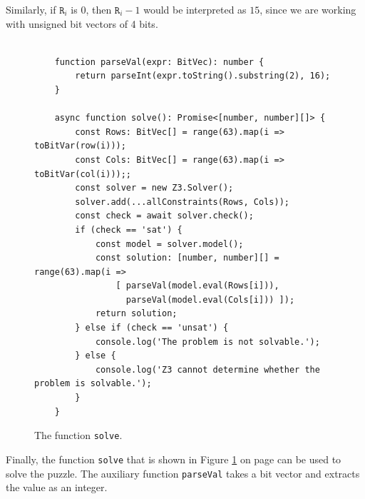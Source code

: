 \begin{enumerate}
      Similarly, if $\mathtt{R}_i$ is $0$, then $\mathtt{R}_i - 1$ would be interpreted as $15$,
      since we are working with unsigned bit vectors of 4 bits.
\end{enumerate}

\begin{figure}[!ht]
\centering
\begin{verbatim}

    function parseVal(expr: BitVec): number {
        return parseInt(expr.toString().substring(2), 16);
    }
    
    async function solve(): Promise<[number, number][]> {
        const Rows: BitVec[] = range(63).map(i => toBitVar(row(i)));
        const Cols: BitVec[] = range(63).map(i => toBitVar(col(i)));;
        const solver = new Z3.Solver();
        solver.add(...allConstraints(Rows, Cols));
        const check = await solver.check();      
        if (check == 'sat') {
            const model = solver.model();
            const solution: [number, number][] = range(63).map(i => 
                [ parseVal(model.eval(Rows[i])),
                  parseVal(model.eval(Cols[i])) ]);
            return solution;
        } else if (check == 'unsat') {
            console.log('The problem is not solvable.');
        } else {
            console.log('Z3 cannot determine whether the problem is solvable.');
        }
    }\end{verbatim}
\vspace*{-0.3cm}
\caption{The function \texttt{solve}.}
\label{fig:Knight's Tour with Z3.ipynb-2}
\end{figure}

Finally, the function \texttt{solve} that is shown in Figure \ref{fig:Knight's Tour with Z3.ipynb-2} on page
\pageref{fig:Knight's Tour with Z3.ipynb-2} can be used to solve the puzzle.
The auxiliary function \texttt{parseVal} takes a bit vector and extracts the value as an integer.

